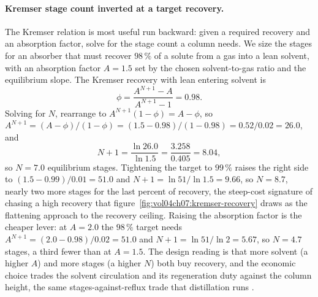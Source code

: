\paragraph{Kremser stage count inverted at a target recovery.} The Kremser
relation is most useful run backward: given a required recovery and an
absorption factor, solve for the stage count a column needs. We size the
stages for an absorber that must recover $98\,\%$ of a solute from a gas into
a lean solvent, with an absorption factor $A = 1.5$ set by the chosen
solvent-to-gas ratio and the equilibrium slope. The Kremser recovery with
lean entering solvent is
\[
\phi = \frac{A^{N+1} - A}{A^{N+1} - 1} = 0.98.
\]
Solving for $N$, rearrange to $A^{N+1}(1 - \phi) = A - \phi$, so $A^{N+1} =
(A - \phi)/(1 - \phi) = (1.5 - 0.98)/(1 - 0.98) = 0.52/0.02 = 26.0$, and
\[
N + 1 = \frac{\ln 26.0}{\ln 1.5} = \frac{3.258}{0.405} = 8.04,
\]
so $N = 7.0$ equilibrium stages. Tightening the target to $99\,\%$ raises the
right side to $(1.5 - 0.99)/0.01 = 51.0$ and $N + 1 = \ln 51/\ln 1.5 =
9.66$, so $N = 8.7$, nearly two more stages for the last percent of recovery,
the steep-cost signature of chasing a high recovery that
figure~\ref{fig:vol04ch07:kremser-recovery} draws as the flattening approach
to the recovery ceiling. Raising the absorption factor is the cheaper lever:
at $A = 2.0$ the $98\,\%$ target needs $A^{N+1} = (2.0 - 0.98)/0.02 = 51.0$
and $N + 1 = \ln 51/\ln 2 = 5.67$, so $N = 4.7$ stages, a third fewer than at
$A = 1.5$. The design reading is that more solvent (a higher $A$) and more
stages (a higher $N$) both buy recovery, and the economic choice trades the
solvent circulation and its regeneration duty against the column height, the
same stages-against-reflux trade that distillation runs
\cite{text:treybal-mass-transfer}.



